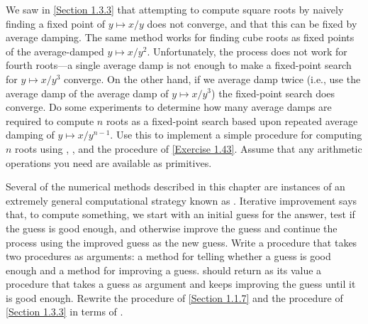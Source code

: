 \begin{exercise}
	\label{Exercise 1.45}
	We saw in \cref{Section 1.3.3} that attempting to compute square roots by naively finding a fixed point of \( y \mapsto x / y \) does not converge, and that this can be fixed by average damping.
	The same method works for finding cube roots as fixed points of the average-damped \( y \mapsto x / y^2 \).
	Unfortunately, the process does not work for fourth roots---a single average damp is not enough to make a fixed-point search for \( y \mapsto x / y^3 \) converge.
	On the other hand, if we average damp twice (i.e., use the average damp of the average damp of \( y \mapsto x / y^3 \)) the fixed-point search does converge.
	Do some experiments to determine how many average damps are required to compute \( n \) roots as a fixed-point search based upon repeated average damping of \( y \mapsto x / y^{n - 1} \).
	Use this to implement a simple procedure for computing \( n \) roots using , , and the  procedure of \cref{Exercise 1.43}.
	Assume that any arithmetic operations you need are available as primitives.
\end{exercise}



\begin{exercise}
	\label{Exercise 1.46}
	Several of the numerical methods described in this chapter are instances of an extremely general computational strategy known as .
	Iterative improvement says that, to compute something, we start with an initial guess for the answer, test if the guess is good enough, and otherwise improve the guess and continue the process using the improved guess as the new guess.
	Write a procedure  that takes two procedures as arguments:
	a method for telling whether a guess is good enough and a method for improving a guess.
	 should return as its value a procedure that takes a guess as argument and keeps improving the guess until it is good enough.
	Rewrite the  procedure of \cref{Section 1.1.7} and the  procedure of \cref{Section 1.3.3} in terms of .
\end{exercise}
